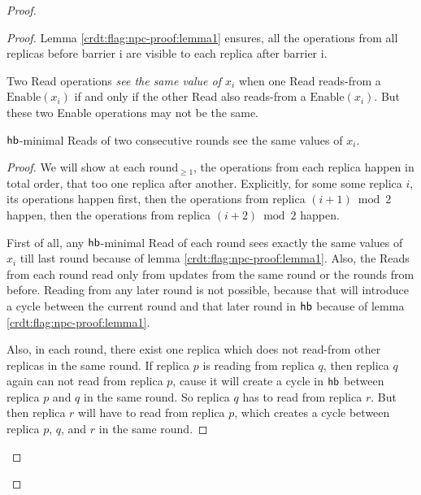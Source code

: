 \begin{proof}
\begin{proof}
Lemma \ref{crdt:flag:npc-proof:lemma1} ensures, all the operations from all replicas before barrier i are visible to each replica after barrier i.

  Two \textrm{Read} operations \emph{see the same value of $x_i$} when one \textrm{Read} reads-from a $\mathrm{Enable}(x_i)$ if and only if the other \textrm{Read} also reads-from a $\mathrm{Enable}(x_i)$. But these two \textrm{Enable} operations may not be the same.

  \begin{lemma}
    \label{crdt:flag:npc-proof:lemma2}
    $\textsf{hb}$-minimal \textrm{Read}s of two consecutive rounds see the same values of $x_i$.
  \end{lemma}

  \begin{proof}
    We will show at each round$_{\geq 1}$, the operations from each replica happen in total order, that too one replica after another. Explicitly, for some some replica $i$, its operations happen first, then the operations from replica $(i+1) \bmod 2$ happen, then the operations from replica $(i+2) \bmod 2$ happen. 

    First of all, any $\textsf{hb}$-minimal \textrm{Read} of each round sees exactly the same values of $x_i$ till last round because of lemma \ref{crdt:flag:npc-proof:lemma1}. Also, the \textrm{Read}s from each round read only from updates from the same round or the rounds from before. Reading from any later round is not possible, because that will introduce a cycle between the current round and that later round in $\textsf{hb}$ because of lemma \ref{crdt:flag:npc-proof:lemma1}.

    Also, in each round, there exist one replica which does not read-from other replicas in the same round. If replica $p$ is reading from replica $q$, then replica $q$ again can not read from replica $p$, cause it will create a cycle in $\textsf{hb}$ between replica $p$ and $q$ in the same round. So replica $q$ has to read from replica $r$. But then replica $r$ will have to read from replica $p$, which creates a cycle between replica $p$, $q$, and $r$ in the same round.


\end{proof}
\end{proof}
\end{proof}
